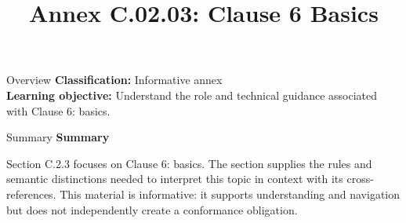 \documentclass[10pt,letterpaper]{article}
\title{Annex C.02.03: Clause 6 Basics}
\author{}
\date{}
\begin{document}
\maketitle
\begin{CornellOverviewBox}{Overview}
\textbf{Classification:} Informative annex\\[2pt]
\textbf{Learning objective:} Understand the role and technical guidance associated with Clause 6: basics.
\end{CornellOverviewBox}\begin{CornellSummaryBox}{Summary}
{\sffamily\bfseries\color{Accent} Summary}\par\vspace{3pt}Section C.2.3 focuses on Clause 6: basics. The section supplies the rules and semantic distinctions needed to interpret this topic in context with its cross-references. This material is informative: it supports understanding and navigation but does not independently create a conformance obligation.
\end{CornellSummaryBox}
\end{document}
